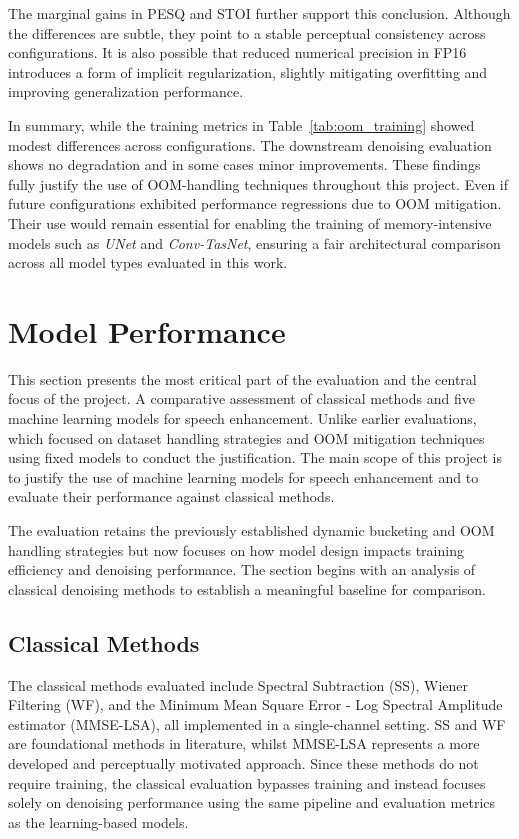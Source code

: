 The marginal gains in PESQ and STOI further support this conclusion. Although the differences are subtle, they point to a stable perceptual consistency across configurations. It is also possible that reduced numerical precision in FP16 introduces a form of implicit regularization, slightly mitigating overfitting and improving generalization performance.

In summary, while the training metrics in Table~\ref{tab:oom_training} showed modest differences across configurations. The downstream denoising evaluation shows no degradation and in some cases minor improvements. These findings fully justify the use of OOM-handling techniques throughout this project. Even if future configurations exhibited performance regressions due to OOM mitigation. Their use would remain essential for enabling the training of memory-intensive models such as \textit{UNet} and \textit{Conv-TasNet}, ensuring a fair architectural comparison across all model types evaluated in this work.

\section{Model Performance}
\label{sec:model_performance}

This section presents the most critical part of the evaluation and the central focus of the project. A comparative assessment of classical methods and five machine learning models for speech enhancement. Unlike earlier evaluations, which focused on dataset handling strategies and OOM mitigation techniques using fixed models to conduct the justification. The main scope of this project is to justify the use of machine learning models for speech enhancement and to evaluate their performance against classical methods.

The evaluation retains the previously established dynamic bucketing and OOM handling strategies but now focuses on how model design impacts training efficiency and denoising performance. The section begins with an analysis of classical denoising methods to establish a meaningful baseline for comparison.

\subsection{Classical Methods}
\label{sec:classical_methods}

The classical methods evaluated include Spectral Subtraction (SS), Wiener Filtering (WF), and the Minimum Mean Square Error - Log Spectral Amplitude estimator (MMSE-LSA), all implemented in a single-channel setting. SS and WF are foundational methods in literature, whilst MMSE-LSA represents a more developed and perceptually motivated approach. Since these methods do not require training, the classical evaluation bypasses training and instead focuses solely on denoising performance using the same pipeline and evaluation metrics as the learning-based models.


